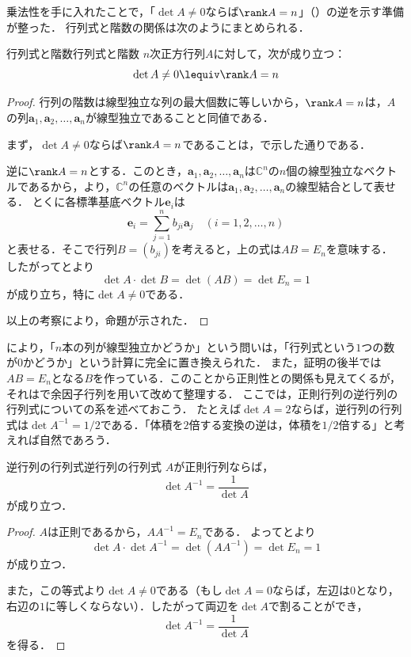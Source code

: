 乗法性を手に入れたことで，「$\det A \ne 0$ならば$\rank A = n$」（）の逆を示す準備が整った．
行列式と階数の関係は次のようにまとめられる．


\begin{prop}{行列式と階数}{行列式と階数}
  $n$次正方行列$A$に対して，次が成り立つ：
  \[
  \det A \ne 0 \lequiv \rank A = n
  \]
\end{prop}

\begin{tleftbar}
\begin{proof}
  行列の階数は線型独立な列の最大個数に等しいから，$\rank A = n$は，$A$の列$\bm{a}_1, \bm{a}_2, \dots, \bm{a}_n$が線型独立であることと同値である．

  まず，$\det A \ne 0$ならば$\rank A = n$であることは，で示した通りである．

  逆に$\rank A = n$とする．このとき，$\bm{a}_1, \bm{a}_2, \dots, \bm{a}_n$は$\mathbb{C}^n$の$n$個の線型独立なベクトルであるから，より，$\mathbb{C}^n$の任意のベクトルは$\bm{a}_1, \bm{a}_2, \dots, \bm{a}_n$の線型結合として表せる．
  とくに各標準基底ベクトル$\bm{e}_i$は
  \[
  \bm{e}_i = \sum_{j=1}^{n} b_{ji} \bm{a}_j \quad (i = 1, 2, \dots, n)
  \]
  と表せる．そこで行列$B = (b_{ji})$を考えると，上の式は$AB = E_n$を意味する．
  したがってとより
  \[
  \det A \cdot \det B = \det(AB) = \det E_n = 1
  \]
  が成り立ち，特に$\det A \ne 0$である．

  以上の考察により，命題が示された．
\end{proof}
\end{tleftbar}

により，「$n$本の列が線型独立かどうか」という問いは，「行列式という$1$つの数が$0$かどうか」という計算に完全に置き換えられた．
また，証明の後半では$AB = E_n$となる$B$を作っている．このことから正則性との関係も見えてくるが，それはで余因子行列を用いて改めて整理する．
ここでは，正則行列の逆行列の行列式についての系を述べておこう．
たとえば$\det A = 2$ならば，逆行列の行列式は$\det A^{-1} = 1/2$である．「体積を$2$倍する変換の逆は，体積を$1/2$倍する」と考えれば自然であろう．

\begin{cor}{逆行列の行列式}{逆行列の行列式}
  $A$が正則行列ならば，
  \[
    \det A^{-1} = \frac{1}{\det A}
  \]
  が成り立つ．
\end{cor}

\begin{tleftbar}
\begin{proof}
  $A$は正則であるから，$AA^{-1}=E_n$である．
  よってとより
  \[
    \det A \cdot \det A^{-1}
    = \det(AA^{-1})
    = \det E_n
    = 1
  \]
  が成り立つ．

  また，この等式より$\det A \ne 0$である（もし$\det A = 0$ならば，左辺は$0$となり，右辺の$1$に等しくならない）．したがって両辺を$\det A$で割ることができ，
  \[
    \det A^{-1} = \frac{1}{\det A}
  \]
  を得る．
\end{proof}
\end{tleftbar}

